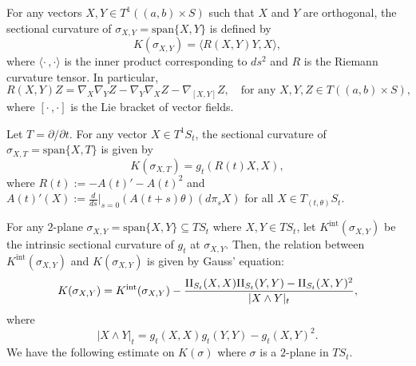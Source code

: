 \documentclass[10pt]{amsart}
\newcommand{\Int}{\mathrm{int}}
\theoremstyle{definition}
\newcommand{\RomanNumeralCaps}[1]
{\MakeUppercase{\romannumeral #1}}
\newcommand{\II}{\textup{\RomanNumeralCaps{2}}}
\renewcommand{\>}{{\rangle}}
\newcommand{\<}{{\langle}}
\begin{document}
For any vectors $X,Y\in T^1\left((a,b)\times S\right)$ such that $X$ and $Y$ are orthogonal, the sectional curvature of $\sigma_{X,Y}=\text{span}\{X, Y\}$ is defined by
\begin{equation}\label{sectional curvature}
K(\sigma_{X,Y})=\langle R(X,Y)Y,X\rangle,
\end{equation}
where $\langle\cdot\,,\cdot\rangle$ is the inner product corresponding to $ds^2$ and $R$ is the Riemann curvature tensor. In particular,
\begin{equation*}
R(X,Y)Z = \nabla_X\nabla_Y Z-\nabla_Y\nabla_X Z-\nabla_{[X,Y]}Z, \quad \text{for any } X,Y, Z\in T((a,b)\times S),
\end{equation*}
where $[\cdot\,,\cdot]$ is the Lie bracket of vector fields.

Let $T=\partial/\partial t$. For any vector $X\in T^1S_t$, the sectional curvature of $\sigma_{X,T}=\text{span}\{X, T\}$ is given by
\begin{equation}\label{def: normal sectional}
K(\sigma_{X,T})=g_t(R(t)X, X),
\end{equation}
where $R(t):=-A(t)'-A(t)^2$ and $A(t)'(X):=\frac{d}{ds}\big|_{s=0}\left(A(t+s)\theta\right)(d\pi_s X)$ for all $X\in T_{(t,\theta)}S_t$.

For any $2$-plane $\sigma_{X,Y}=\text{span}\{X, Y\}\subseteq TS_t$ where $X, Y\in TS_t$, let $K^{\Int}(\sigma_{X,Y})$ be the intrinsic sectional curvature of $g_t$ at $\sigma_{X,Y}$. Then, the relation between $K^{\Int}(\sigma_{X, Y})$ and $K(\sigma_{X, Y})$ is given by Gauss' equation:
\begin{equation}\label{Gauss equation}
K(\sigma_{X, Y})=K^{\Int}(\sigma_{X, Y})-\frac{\II_{S_t}(X, X)\II_{S_t}(Y, Y)-\II_{S_t}(X, Y)^2}{|X\wedge Y|_t},
\end{equation}
where
\begin{equation}\label{XwedgeY}
|X\wedge Y|_t=g_t(X, X)g_t(Y, Y)-g_t(X, Y)^2.
\end{equation}
We have the following estimate on $K(\sigma)$ where
$\sigma$ is a $2$-plane in $TS_t$.
\end{document}
